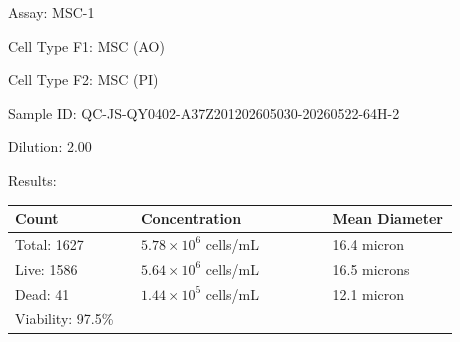 \documentclass[UTF8,10pt,a4paper,fontset=fandol]{ctexart}
\newcommand{\fieldvalue}[1]{#1}
\begin{document}
\newpage

Assay: %
\fieldvalue{MSC-1}

\medskip
Cell Type F1: %
\fieldvalue{MSC (AO)}

\medskip
Cell Type F2: %
\fieldvalue{MSC (PI)}

\medskip
Sample ID: %
\fieldvalue{QC-JS-QY0402-A37Z201202605030-20260522-64H-2}

\medskip
Dilution: %
\fieldvalue{2.00}

\bigskip
\noindent Results:

\medskip
\begin{center}
\begin{tabular}{@{}p{0.25\linewidth}p{0.38\linewidth}p{0.25\linewidth}@{}}
\textbf{Count} & \textbf{Concentration} & \textbf{Mean Diameter} \\
\hline
Total: %
\fieldvalue{1627}
&
\fieldvalue{$5.78 \times 10^{6}$ cells/mL}
&
\fieldvalue{16.4 micron}
\\[2pt]
Live: %
\fieldvalue{1586}
&
\fieldvalue{$5.64 \times 10^{6}$ cells/mL}
&
\fieldvalue{16.5 microns}
\\[2pt]
Dead: %
\fieldvalue{41}
&
\fieldvalue{$1.44 \times 10^{5}$ cells/mL}
&
\fieldvalue{12.1 micron}
\\[2pt]
Viability: %
\fieldvalue{97.5\%}
&
&
\\
\end{tabular}
\end{center}

\bigskip
\end{document}
